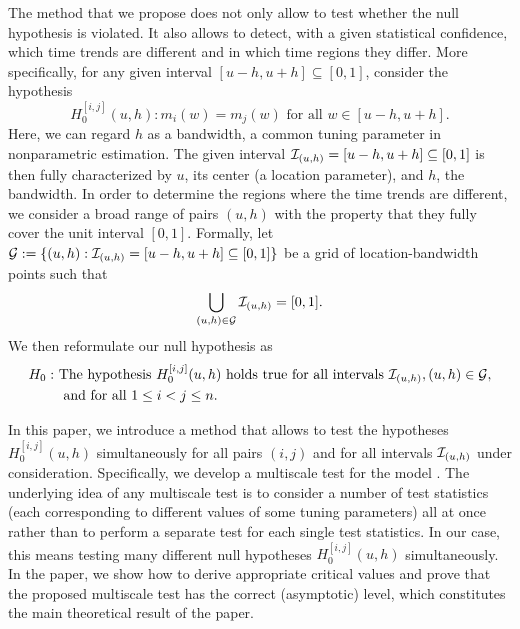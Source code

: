 \documentclass[a4paper,12pt]{article}
\makeatletter
\renewcommand{\eqref}[1]{\tagform@{\ref{#1}}}
\makeatother
\begin{document}
The method that we propose does not only allow to test whether the null hypothesis is violated. It also allows to detect, with a given statistical confidence, which time trends are different and in which time regions they differ. More specifically, for any given interval $[u-h,u+h] \subseteq [0,1]$, consider the hypothesis
\[ H_0^{[i,j]}(u,h): m_i(w) = m_j(w) \text{ for all } w \in [u-h,u+h]. \] 
Here, we can regard $h$ as a bandwidth, a common tuning parameter in nonparametric estimation. The given interval $\mathcal{I}_{(u, h)} = [u-h,u+h] \subseteq [0,1]$ is then fully characterized by $u$, its center (a location parameter), and $h$, the bandwidth. In order to determine the regions where the time trends are different, we consider a broad range of pairs $(u, h)$ with the property that they fully cover the unit interval $[0, 1]$. Formally, let \linebreak $\mathcal{G} := \{(u, h): \mathcal{I}_{(u, h)} = [u-h, u+h] \subseteq [0,1]\}$ be a grid of location-bandwidth points such that 
\begin{align*}
\bigcup_{(u, h) \in \mathcal{G}}  \mathcal{I}_{(u, h)} = [0,1].
\end{align*}
We then reformulate our null hypothesis \eqref{eq:null} as
\begin{align*}
H_0: \ & \text{The hypothesis } H_0^{[i,j]}(u,h) \text{ holds true for all intervals }  \mathcal{I}_{(u, h)}, (u, h) \in \mathcal{G}, \\ & \text{ and for all } 1 \le i < j \le n. 
\end{align*} 

In this paper, we introduce a method that allows to test the hypotheses $H_0^{[i,j]}(u,h)$  simultaneously for all pairs $(i, j)$ and for all intervals $\mathcal{I}_{(u, h)}$ under consideration. Specifically, we develop a multiscale test for the model \eqref{eq:model}. The underlying idea of any multiscale test is to consider a number of test statistics (each corresponding to different values of some tuning parameters) all at once rather than to perform a separate test for each single test statistics. In our case, this means testing many different null hypotheses $H_0^{[i,j]}(u,h)$ simultaneously. In the paper, we show how to derive appropriate critical values and prove that the proposed multiscale test has the correct (asymptotic) level, which constitutes the main theoretical result of the paper.
\end{document}

